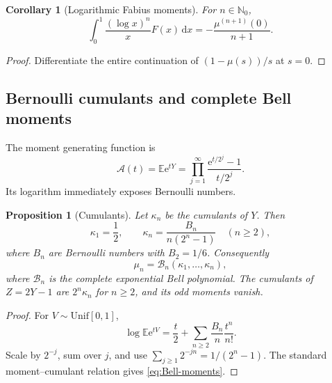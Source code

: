 \documentclass[11pt]{article}
\newtheorem{proposition}[theorem]{Proposition}
\newtheorem{corollary}[theorem]{Corollary}
\theoremstyle{definition}
\theoremstyle{remark}
\newcommand{\N}{\mathbb N}
\newcommand{\E}{\mathbb E}
\newcommand{\dd}{\,\mathrm d}
\newcommand{\e}{\mathrm e}
\begin{document}
\begin{corollary}[Logarithmic Fabius moments]
For $n\in\N_0$,
\begin{equation}
 \int_0^1\frac{(\log x)^n}{x}F(x)\dd x
 =-\frac{\mu^{(n+1)}(0)}{n+1}.
 \label{eq:log-F-moments}
\end{equation}
\end{corollary}

\begin{proof}
Differentiate the entire continuation of $(1-\mu(s))/s$ at $s=0$.
\end{proof}

\subsection{Bernoulli cumulants and complete Bell moments}

The moment generating function is
\begin{equation}
 \mathscr A(t)=\E\e^{tY}
 =\prod_{j=1}^{\infty}\frac{\e^{t/2^j}-1}{t/2^j}.
 \label{eq:Y-mgf}
\end{equation}
Its logarithm immediately exposes Bernoulli numbers.

\begin{proposition}[Cumulants]
\label{prop:cumulants}
Let $\kappa_n$ be the cumulants of $Y$.  Then
\begin{equation}
 \kappa_1=\frac12,
 \qquad
 \kappa_n=\frac{B_n}{n(2^n-1)}\quad(n\ge2),
 \label{eq:Y-cumulants}
\end{equation}
where $B_n$ are Bernoulli numbers with $B_2=1/6$.  Consequently
\begin{equation}
 \mu_n=\mathcal B_n(\kappa_1,\ldots,\kappa_n),
 \label{eq:Bell-moments}
\end{equation}
where $\mathcal B_n$ is the complete exponential Bell polynomial.  The cumulants of
$Z=2Y-1$ are $2^n\kappa_n$ for $n\ge2$, and its odd moments vanish.
\end{proposition}

\begin{proof}
For $V\sim\mathrm{Unif}[0,1]$,
\[
 \log\E\e^{tV}=\frac t2+\sum_{n\ge2}\frac{B_n}{n}\frac{t^n}{n!}.
\]
Scale by $2^{-j}$, sum over $j$, and use
$\sum_{j\ge1}2^{-jn}=1/(2^n-1)$.  The standard moment--cumulant relation gives
\cref{eq:Bell-moments}.
\end{proof}

\begin{table}[H]
\centering
\caption{Exact moments generated from Bernoulli cumulants.}
\label{tab:moments}

\end{table}
\end{document}
